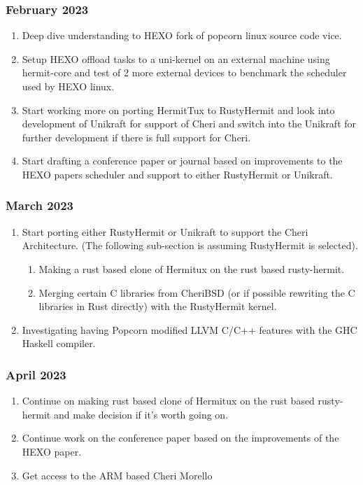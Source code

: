   \subsubsection{February 2023}
  \begin{enumerate}
    \item Deep dive understanding to HEXO fork of popcorn linux source code vice.
    \item Setup HEXO offload tasks to a uni-kernel on an external machine using hermit-core 
    and test of 2 more external devices to benchmark the scheduler used by HEXO linux. 
    \item Start working more on porting HermitTux to RustyHermit and look into 
    development of Unikraft for support of Cheri and switch into the Unikraft for further 
    development if there is full support for Cheri. 
    \item Start drafting a conference paper or journal based on improvements to the HEXO papers 
    scheduler and support to either RustyHermit or Unikraft. 
  \end{enumerate}

  \subsubsection{March 2023}
  \begin{enumerate}
    \item Start porting either RustyHermit or Unikraft to support the Cheri Architecture. (The following sub-section is assuming 
          RustyHermit is selected).
          \begin{enumerate}
            \item Making a rust based clone of Hermitux on the rust based rusty-hermit. 
            \item Merging certain C libraries from CheriBSD (or if possible rewriting the C libraries in Rust directly) 
            with the RustyHermit kernel. 
          \end{enumerate}
    \item Investigating having Popcorn modified LLVM C/C++ features with the GHC Haskell compiler. 
  \end{enumerate}

  \subsubsection{April 2023}
  \begin{enumerate}
    \item Continue on making rust based clone of Hermitux on the rust based rusty-hermit and make decision if it's worth going on.
    \item Continue work on the conference paper based on the improvements of the HEXO paper.
    \item Get access to the ARM based Cheri Morello
  \end{enumerate}

